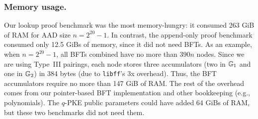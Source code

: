 \subsubsection{Memory usage.}
\label{s:eval:memory}
\newcommand{\frontierOverhead}{390}
Our lookup proof benchmark was the most memory-hungry: it consumed 263 GiB of RAM for AAD size $n = 2^{20}-1$.
In contrast, the append-only proof benchmark consumed only 12.5 GiBs of memory, since it did not need BFTs.
As an example, when $n = 2^{20} - 1$, all BFTs combined have no more than $\frontierOverhead n$ nodes.
Since we are using Type~III pairings, each node stores three accumulators (two in $\mathbb{G}_1$ and one in $\mathbb{G}_2$) in 384 bytes (due to \texttt{libff}'s 3x overhead).
Thus, the BFT accumulators require no more than 147 GiB of RAM.
%
The rest of the overhead comes from our pointer-based BFT implementation and other bookkeeping (e.g., polynomials).
The $q$-PKE public parameters could have added 64 GiBs of RAM, but these two benchmarks did not need them.

